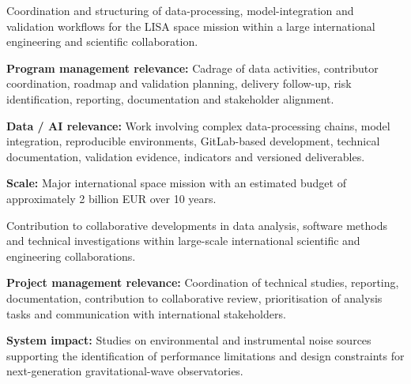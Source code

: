 \documentclass[8pt,a4paper,ragged2e,withhyper]{altacv}
\begin{document}
Coordination and structuring of data-processing, model-integration and validation workflows for the LISA space mission within a large international engineering and scientific collaboration.

\textbf{Program management relevance:} Cadrage of data activities, contributor coordination, roadmap and validation planning, delivery follow-up, risk identification, reporting, documentation and stakeholder alignment.

\textbf{Data / AI relevance:} Work involving complex data-processing chains, model integration, reproducible environments, GitLab-based development, technical documentation, validation evidence, indicators and versioned deliverables.

\textbf{Scale:} Major international space mission with an estimated budget of approximately 2 billion EUR over 10 years.

\divider


Contribution to collaborative developments in data analysis, software methods and technical investigations within large-scale international scientific and engineering collaborations.

\textbf{Project management relevance:} Coordination of technical studies, reporting, documentation, contribution to collaborative review, prioritisation of analysis tasks and communication with international stakeholders.

\textbf{System impact:} Studies on environmental and instrumental noise sources supporting the identification of performance limitations and design constraints for next-generation gravitational-wave observatories.


\vspace{-.3cm}


{\small
{}
}
\end{document}
